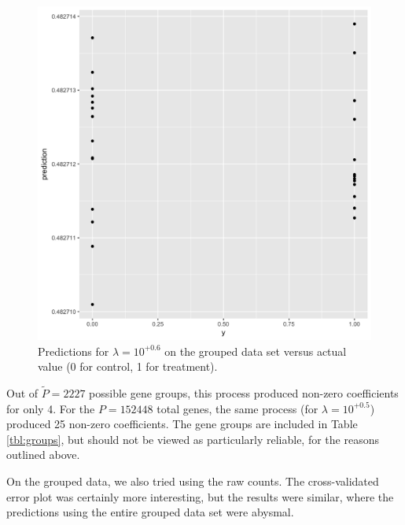 \documentclass{article}
\begin{document}
\begin{figure}[h]
\begin{center}
\includegraphics[scale=0.1]{kegg-cv-prediction.png}
\caption{\label{fig:two}Predictions for $\lambda=10^{+0.6}$ on the grouped data set versus actual value (0 for control, 1 for treatment).}
\end{center}
\end{figure}

Out of $\tilde{P}=2227$ possible gene groups, this process produced non-zero coefficients for only 4. For the $P=152448$ total genes, the same process (for $\lambda=10^{+0.5}$) produced 25 non-zero coefficients. The gene groups are included in Table \ref{tbl:groups}, but should not be viewed as particularly reliable, for the reasons outlined above.

On the grouped data, we also tried using the raw counts. The cross-validated error plot was certainly more 
interesting, but the results were similar, where the predictions using the entire grouped data set were abysmal.
\end{document}
